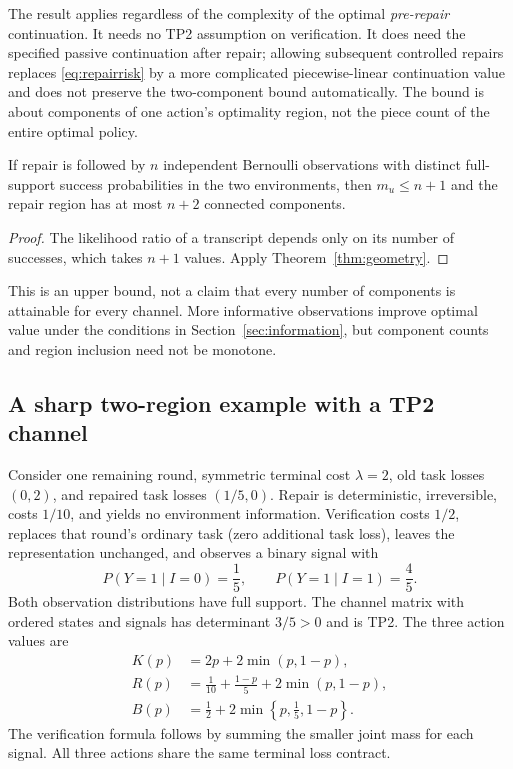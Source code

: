 The result applies regardless of the complexity of the optimal \emph{pre-repair}
continuation. It needs no TP2 assumption on verification. It does need the
specified passive continuation after repair; allowing subsequent controlled
repairs replaces \eqref{eq:repairrisk} by a more complicated piecewise-linear
continuation value and does not preserve the two-component bound automatically.
The bound is about components of one action's optimality region, not the
piece count of the entire optimal policy.

\begin{corollary}
\label{cor:counts}
If repair is followed by $n$ independent Bernoulli observations with distinct
full-support success probabilities in the two environments, then $m_u\le n+1$
and the repair region has at most $n+2$ connected components.
\end{corollary}
\begin{proof}
The likelihood ratio of a transcript depends only on its number of successes,
which takes $n+1$ values. Apply Theorem~\ref{thm:geometry}.
\end{proof}
This is an upper bound, not a claim that every number of components is
attainable for every channel. More informative observations improve optimal
value under the conditions in Section~\ref{sec:information}, but component counts
and region inclusion need not be monotone.

\subsection{A sharp two-region example with a TP2 channel}
\label{sec:counter}
Consider one remaining round, symmetric terminal cost $\lambda=2$, old task
losses $(0,2)$, and repaired task losses $(1/5,0)$. Repair is deterministic,
irreversible, costs $1/10$, and yields no environment information. Verification
costs $1/2$, replaces that round's ordinary task (zero additional task loss),
leaves the representation unchanged, and observes a binary signal with
\begin{equation}
P(Y=1\mid I=0)=\frac15,\qquad
P(Y=1\mid I=1)=\frac45.
\end{equation}
Both observation distributions have full support. The channel matrix with
ordered states and signals has determinant $3/5>0$ and is TP2.
The three action values are
\begin{align}
K(p)&=2p+2\min(p,1-p),\\
R(p)&=\frac1{10}+\frac{1-p}{5}+2\min(p,1-p),\\
B(p)&=\frac12+2\min\left\{p,\frac15,1-p\right\}.
\label{eq:countervalues}
\end{align}
The verification formula follows by summing the smaller joint mass for each
signal. All three actions share the same terminal loss contract.

